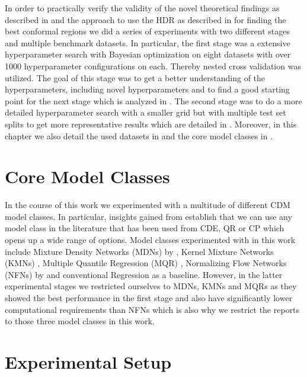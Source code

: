 In order to practically verify the validity of the novel theoretical findings as described in  and the approach to use the HDR as described in  for finding the best conformal regions we did a series of experiments with two different stages and multiple benchmark datasets. In particular, the first stage was a extensive hyperparameter search with Bayesian optimization on eight datasets with over 1000 hyperparameter configurations on each. Thereby nested cross validation was utilized. The goal of this stage was to get a better understanding of the hyperparameters, including novel hyperparameters and to find a good starting point for the next stage which is analyzed in . The second stage was to do a more detailed hyperparameter search with a smaller grid but with multiple test set splits to get more representative results which are detailed in . Moreover, in this chapter we also detail the used datasets in  and the core model classes in .

\section{Core Model Classes}\label{sec:core_model_classes}

In the course of this work we experimented with a multitude of different CDM model classes. In particular, insights gained from  establish that we can use any model class in the literature that has been used from CDE, QR or CP which opens up a wide range of options. Model classes experimented with in this work include Mixture Density Networks (MDNs) by \cite{bishop1994mixture}, Kernel Mixture Networks (KMNs) \cite{ambrogioni2017kernel}, Multiple Quantile Regression (MQR) \cite{gupta2022nested,moon2021learning}, Normalizing Flow Networks (NFNs) by \cite{trippe2018conditional} and conventional Regression as a baseline. However, in the latter experimental stages we restricted ourselves to MDNs, KMNs and MQRs as they showed the best performance in the first stage and also have significantly lower computational requirements than NFNs which is also why we restrict the reports to those three model classes in this work.

\section{Experimental Setup}\label{sec:experimental_setup}

